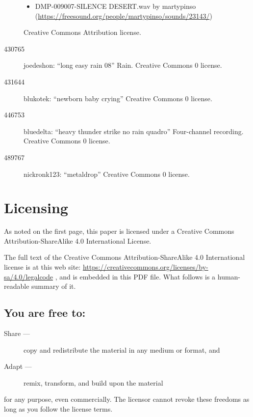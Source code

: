\documentclass[letterpaper,twoside]{article}
\begin{document}
\begin{description}
\begin{itemize}
\item DMP-009007-SILENCE DESERT.wav by martypinso (\url{https://freesound.org/people/martypinso/sounds/23143/})
\end{itemize}
Creative Commons Attribution license.
\item[430765]joedeshon: ``long easy rain 08''
  Rain.  Creative Commons 0 license.
\item[431644]blukotek: ``newborn baby crying''
  Creative Commons 0 license.
\item[446753]bluedelta: ``heavy thunder strike no rain quadro''
  Four-channel recording.  Creative Commons 0 license.
\item[489767]nickronk123: ``metaldrop''
  Creative Commons 0 license.
\end{description}

\newpage

\section{Licensing}
\label{section:Licensing}
As noted on the first page, this paper is licensed under a Creative
Commons Attribution-ShareAlike 4.0 International License.

The full text of the Creative Commons Attribution-ShareAlike 4.0
International license is at this web site:
\url{https://creativecommons.org/licenses/by-sa/4.0/legalcode}%
, and is embedded in this
PDF file.  What follows is a human-readable summary of it.

\subsection{You are free to:}
\begin{description}
\item[Share ---]copy and redistribute the material in any medium or format, and
\item[Adapt ---]remix, transform, and build upon the material
\end{description}
for any purpose, even commercially.  The licensor cannot revoke these
freedoms as long as you follow the license terms.
\end{document}
